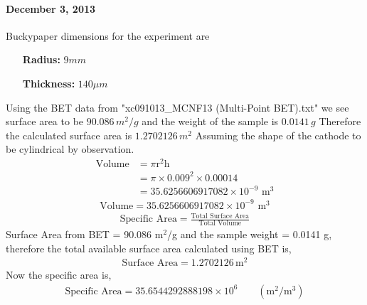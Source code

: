\documentclass[12pt]{book}
\begin{document}
\paragraph*{December 3, 2013}
Buckypaper dimensions for the experiment are
\begin{enumerate}
\item [\textbf{Radius:}]$9mm$
\item [\textbf{Thickness:}]$140\mu m$
\end{enumerate}
Using the BET data from "xc091013\_MCNF13 (Multi-Point BET).txt" we see surface area to be $90.086\,m^2/g$ and the weight of the sample is $0.0141\,g$
Therefore the calculated surface area is $1.2702126\,m^2$
Assuming the shape of the cathode to be cylindrical by observation.
\begin{align}
\textrm{Volume}&=\pi\textrm{r}^2\textrm{h}\nonumber\\
&=\pi\times 0.009^2\times 0.00014\nonumber\\
&=35.6256606917082\times 10^{-9} \textrm{ m}^3\nonumber
\end{align}
\begin{align}
\boxed{\textrm{Volume}=35.6256606917082\times 10^{-9} \textrm{ m}^3}
\end{align}
\begin{align}
\textrm{Specific Area} = \frac{\textrm{Total Surface Area}}{\textrm{Total Volume}}
\end{align}
Surface Area from BET = 90.086 m$^2$/g and the
sample weight = 0.0141 g, 
therefore the total available surface area calculated using BET is,
\begin{align} 
\boxed{\textrm{Surface Area} = 1.2702126 \,\textrm{m}^2}
\end{align}
Now the specific area is,
\begin{align}
\boxed{\textrm{Specific Area}=35.6544292888198\times 10^6\qquad (\textrm{m}^2/\textrm{m}^3)}
\end{align}
\end{document}
